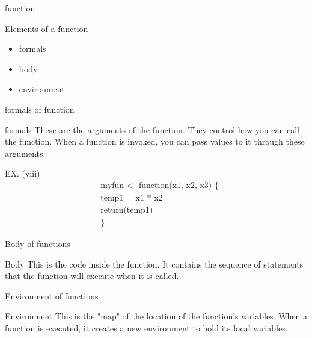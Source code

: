 \documentclass{beamer}\usepackage[]{graphicx}\usepackage[]{xcolor}
\begin{document}

\begin{frame}{function}
    \begin{block}{Elements of a function}
        \begin{itemize}
            \item formals
            \item body
            \item environment
        \end{itemize}
        
    \end{block}
\end{frame}


\begin{frame}{formals of function}
    \begin{block}{formals}
        These are the arguments of the function. They control how you can call the function. When a function is invoked, you can pass values to it through these arguments.
    \end{block}
    \begin{exampleblock}{EX. (viii)}
        \label{ex8}
        \begin{align*}
            & \text{myfun <- function(x1, x2, x3) \{}\\
            & \text{temp1 = x1 * x2} \\
            & \text{return(temp1)}\\
            & \}
        \end{align*}
    \end{exampleblock}
\end{frame}

\begin{frame}{Body of functions}
    \begin{block}{Body}
        This is the code inside the function. It contains the sequence of statements that the function will execute when it is called.
    \end{block}
\end{frame}

\begin{frame}{Environment of functions}
    \begin{block}{Environment}
        This is the "map" of the location of the function's variables. When a function is executed, it creates a new environment to hold its local variables.
    \end{block}

    
\end{frame}
\end{document}

